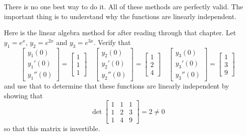 \documentclass{ximera}
\begin{document}
\begin{exampleSol}
    There is no one best way to do it.  All of these methods are perfectly valid. The important thing is to understand why the functions are linearly independent.
\end{exampleSol}

\begin{exercise}
    Here is the linear algebra method for after reading through that chapter. Let $y_1 = e^x$, $y_2 = e^{2x}$ and $y_3 = e^{3x}$. Verify that
    \begin{equation*}
        \begin{bmatrix}
            y_1(0) \\ 
            y_1'(0) \\ 
            y_1''(0) 
        \end{bmatrix} 
        = \begin{bmatrix} 
            1 \\ 
            1 \\ 
            1 
        \end{bmatrix} \quad 
        \begin{bmatrix}
            y_2(0) \\ 
            y_2'(0) \\ 
            y_2''(0) 
        \end{bmatrix} 
        = \begin{bmatrix} 
            1 \\ 
            2 \\ 
            4 
        \end{bmatrix} \quad
        \begin{bmatrix}
            y_3(0) \\ 
            y_3'(0) \\ 
            y_3''(0) 
        \end{bmatrix} 
        = \begin{bmatrix} 
            1 \\ 
            3 \\ 
            9 
        \end{bmatrix}
    \end{equation*}
    and use that to determine that these functions are linearly independent by showing that
    \begin{equation*}
        \det \begin{bmatrix} 1 & 1 & 1 \\ 1 & 2 & 3 \\ 1 & 4 & 9 \end{bmatrix} = 2 \neq 0
    \end{equation*}
    so that this matrix is invertible.
\end{exercise}
\end{document}
